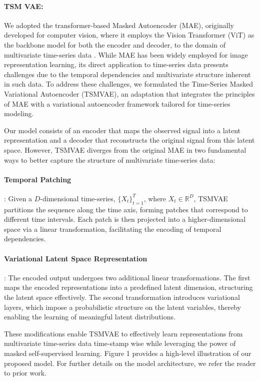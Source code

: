 \documentclass[12pt]{article} %
\newcommand{\para}[1]{\vspace*{-4.5mm}\paragraph{#1}}
\begin{document}
\para{TSM VAE:}
We adopted the transformer-based Masked Autoencoder (MAE), originally developed for computer vision, where it employs the Vision Transformer (ViT) as the backbone model for both the encoder and decoder, to the domain of multivariate time-series data \citep{dosovitskiy2020image, he2022masked}.
While MAE has been widely employed for image representation learning, its direct application to time-series data presents challenges due to the temporal dependencies and multivariate structure inherent in such data.
To address these challenges, we formulated the Time-Series Masked Variational Autoencoder (TSMVAE), an adaptation that integrates the principles of MAE with a variational autoencoder framework tailored for time-series modeling.

Our model consists of an encoder that maps the observed signal into a latent representation and a decoder that reconstructs the original signal from this latent space. However, TSMVAE diverges from the original MAE in two fundamental ways to better capture the structure of multivariate time-series data:

\para{Temporal Patching}: Given a $D$-dimensional time-series, $\{X_t\}_{t=1}^{T}$, where $X_t \in \mathbb{R}^D$, TSMVAE partitions the sequence along the time axis, forming patches that correspond to different time intervals. Each patch is then projected into a higher-dimensional space via a linear transformation, facilitating the encoding of temporal dependencies.

\para{Variational Latent Space Representation}: The encoded output undergoes two additional linear transformations. The first maps the encoded representations into a predefined latent dimension, structuring the latent space effectively. The second transformation introduces variational layers, which impose a probabilistic structure on the latent variables, thereby enabling the learning of meaningful latent distributions. 

These modifications enable TSMVAE to effectively learn representations from multivariate time-series data time-stamp wise while leveraging the power of masked self-supervised learning. Figure 1 provides a high-level illustration of our proposed model. For further details on the model architecture, we refer the reader to prior work.
\end{document}
